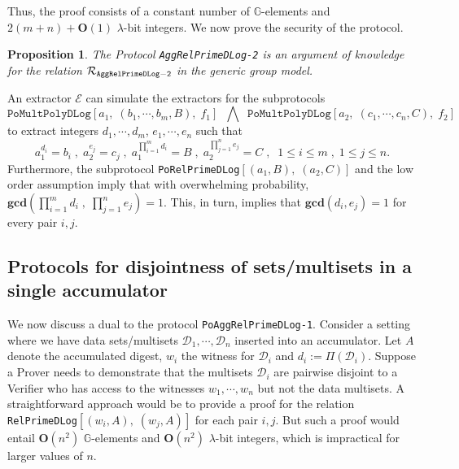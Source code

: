 \documentclass[11pt, lettersize, notitlepage, leqno, footskip=0.6cm]{article}
\newcommand{\pl}{\prod\limits}
\newcommand{\ttt}{\texttt}
\newcommand{\mc}{\mathcal}
\newcommand{\mb}{\mathbb}
\newcommand{\mbf}{\mathbf}
\newcommand{\lam}{\lambda}
\newcommand{\bO}{\mbf{O}}
\newcommand{\vs}{\vspace{-0.15cm}}
\newcommand{\noin}{\noindent}
\newcommand{\op}{overwhelming probability}
\newcommand{\GCD}{\mbf{gcd}}
\newcommand{\E}{\mc{E}}
\newtheorem{Prop}[Thm]{Proposition}
\numberwithin{equation}{section}
\begin{document}
\noin Thus, the proof consists of a constant number of $\mb{G}$-elements and $2(m+n)+\bO(1)$ $\lam$-bit integers. We now prove the security of the protocol.\vspace{0.2cm}


\begin{Prop} The Protocol \verb|AggRelPrimeDLog-2| is an argument of knowledge for the relation $\mc{R}_{\tt{AggRelPrimeDLog-2}}$ in the generic group
model.\end{Prop}

\begin{prf} An extractor $\E$ can simulate the extractors for the subprotocols \vs $$\ttt{PoMultPolyDLog}[a_1,\;(b_1,\cdots,b_m, B),\; f_1]\;\;\bigwedge\;\;\ttt{PoMultPolyDLog}[a_2,\;(c_1,\cdots,c_n, C),\; f_2] $$ to extract integers $d_1,\cdots,d_m$, $e_1,\cdots,e_n$ such that \vs $$a_1^{d_i} = b_i\;,\;a_2^{e_j} = c_j \;,\; a_1^{\pl_{i=1}^m d_i} = B\;,\;a_2^{\pl_{j=1}^n e_j} = C \;,\;\;1\leq i\leq m\;,\;1\leq j\leq n.$$ Furthermore, the subprotocol \verb|PoRelPrimeDLog|$[(a_1, B),\;(a_2, C)]$ and the low order assumption imply that with \op, $\GCD(\prod_{i=1}^m d_i\;,\; \prod_{j=1}^n e_j) = 1$. This, in turn, implies that $\GCD(d_i,e_j) = 1$ for every pair $i,j$.\end{prf}




\subsection{\fontsize{11}{11}\selectfont Protocols for disjointness of sets/multisets in a single accumulator} 


We now discuss a dual to the protocol \verb|PoAggRelPrimeDLog-1|. Consider a setting where we have data sets/multisets $\mc{D}_1,\cdots, \mc{D}_n$ inserted into an accumulator. Let $A$ denote the accumulated digest, $w_i$ the witness for $\mc{D}_i$ and $d_i:= \Pi(\mc{D}_i)$. Suppose a Prover needs to demonstrate that the multisets $\mc{D}_i$ are pairwise disjoint to a Verifier who has access to the witnesses $w_1,\cdots,w_n$ but not the data multisets. A straightforward approach would be to provide a proof for the relation \verb|RelPrimeDLog|$[(w_i, A),\;(w_j, A)]$ for each pair $i,j$. But such a proof would entail $\mbf{O}(n^2)$ $\mb{G}$-elements and $\mbf{O}(n^2)$ $\lam$-bit integers, which is impractical for larger values of $n$.
\end{document}
